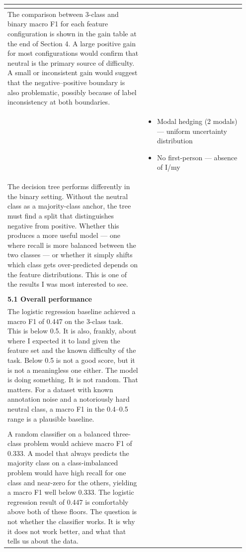 \documentclass[11pt]{article}
\begin{document}
\begin{longtable}{|p{0.55\linewidth}|p{0.40\linewidth}|}
\begin{itemize}[leftmargin=1em,itemsep=1pt,topsep=1pt,parsep=0pt]
\end{itemize} \\
\hline
The comparison between 3-class and binary macro F1 for each feature configuration is shown in the gain table at the end of Section 4. A large positive gain for most configurations would confirm that neutral is the primary source of difficulty. A small or inconsistent gain would suggest that the negative--positive boundary is also problematic, possibly because of label inconsistency at both boundaries. & \\[2pt]
\hline
\rule[-3.5cm]{0pt}{3.5cm} & \begin{itemize}[leftmargin=1em,itemsep=1pt,topsep=1pt,parsep=0pt]
  \item Modal hedging (2 modals) --- uniform uncertainty distribution
  \item No first-person --- absence of I/my
\end{itemize} \\
\hline
The decision tree performs differently in the binary setting. Without the neutral class as a majority-class anchor, the tree must find a split that distinguishes negative from positive. Whether this produces a more useful model --- one where recall is more balanced between the two classes --- or whether it simply shifts which class gets over-predicted depends on the feature distributions. This is one of the results I was most interested to see. & \\[2pt]
\hline
\rule[-3.5cm]{0pt}{3.5cm} &  \\
\hline
\textbf{5.1 Overall performance}\\[4pt]
The logistic regression baseline achieved a macro F1 of 0.447 on the 3-class task. This is below 0.5. It is also, frankly, about where I expected it to land given the feature set and the known difficulty of the task. Below 0.5 is not a good score, but it is not a meaningless one either. The model is doing something. It is not random. That matters. For a dataset with known annotation noise and a notoriously hard neutral class, a macro F1 in the 0.4--0.5 range is a plausible baseline. & \\[2pt]
\hline
\rule[-3.5cm]{0pt}{3.5cm} &  \\
\hline
A random classifier on a balanced three-class problem would achieve macro F1 of 0.333. A model that always predicts the majority class on a class-imbalanced problem would have high recall for one class and near-zero for the others, yielding a macro F1 well below 0.333. The logistic regression result of 0.447 is comfortably above both of these floors. The question is not whether the classifier works. It is why it does not work better, and what that tells us about the data. & \\[2pt]

\end{longtable}
\end{document}
